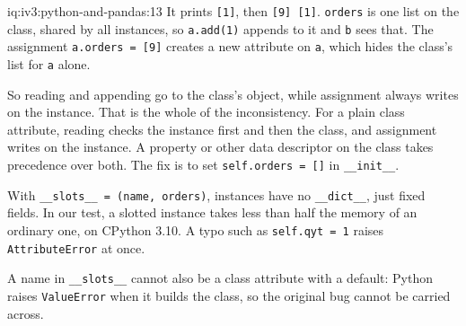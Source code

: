 \begin{solution}{iq:iv3:python-and-pandas:13}
It prints \texttt{[1]}, then \texttt{[9] [1]}. \texttt{orders} is one list on the class, shared by all instances, so \texttt{a.add(1)} appends to it and \texttt{b} sees that. The assignment \texttt{a.orders = [9]} creates a new attribute on \texttt{a}, which hides the class's list for \texttt{a} alone.

So reading and appending go to the class's object, while assignment always writes on the instance. That is the whole of the inconsistency. For a plain class attribute, reading checks the instance first and then the class, and assignment writes on the instance. A property or other data descriptor on the class takes precedence over both. The fix is to set \texttt{self.orders = []} in \texttt{\_\_init\_\_}.

With \texttt{\_\_slots\_\_ = (\textquotesingle name\textquotesingle, \textquotesingle orders\textquotesingle)}, instances have no \texttt{\_\_dict\_\_}, just fixed fields. In our test, a slotted instance takes less than half the memory of an ordinary one, on CPython 3.10. A typo such as \texttt{self.qyt = 1} raises \texttt{AttributeError} at once.

A name in \texttt{\_\_slots\_\_} cannot also be a class attribute with a default: Python raises \texttt{ValueError} when it builds the class, so the original bug cannot be carried across.

\end{solution}

